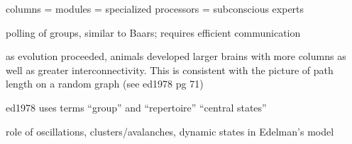 \vspace{3em}
columns = modules = specialized processors = subconscious experts

\vspace{3em}
\cite{ed1978} polling of groups, similar to Baars; requires efficient communication

\vspace{3em}
as evolution proceeded, animals developed larger brains with more columns as well as greater interconnectivity. This is consistent with the picture of path length on a random graph (see ed1978 pg 71)

\vspace{3em}
ed1978 uses terms ``group'' and ``repertoire'' ``central states''

\vspace{3em}
role of oscillations, clusters/avalanches, dynamic states in Edelman's model

\vspace{3em}